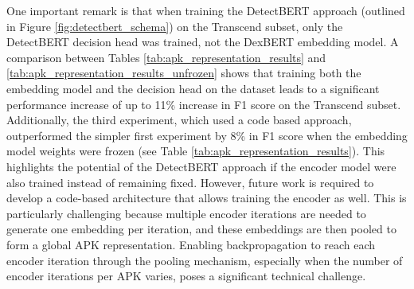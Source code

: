 One important remark is that when training the DetectBERT approach (outlined in Figure \ref{fig:detectbert_schema}) 
on the Transcend subset, only the DetectBERT decision head was trained, not the DexBERT embedding model.
A comparison between Tables \ref{tab:apk_representation_results} and \ref{tab:apk_representation_results_unfrozen} 
shows that training both the embedding model and the decision head on the dataset leads to a significant 
performance increase of up to 11\% increase in F1 score on the Transcend subset.
Additionally, the third experiment, which used a code based approach, 
outperformed the simpler first experiment by 8\% in F1 score when the embedding model weights were frozen 
(see Table \ref{tab:apk_representation_results}).
This highlights the potential of the DetectBERT approach if the encoder model were also trained instead of remaining fixed.
However, future work is required to develop a code-based architecture that allows training the encoder as well.
This is particularly challenging because multiple encoder iterations are needed to generate one embedding per iteration, 
and these embeddings are then pooled to form a global APK representation.
Enabling backpropagation to reach each encoder iteration through the pooling mechanism, 
especially when the number of encoder iterations per APK varies, poses a significant technical challenge.

